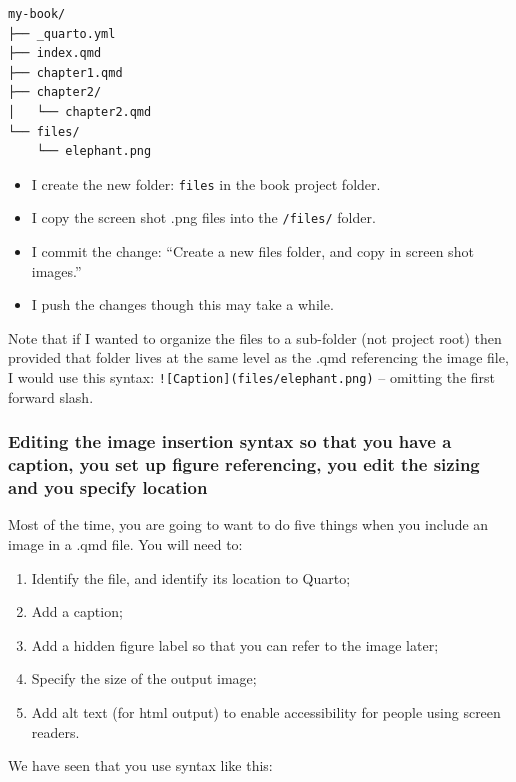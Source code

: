 \documentclass[
  letterpaper,
  DIV=11,
  numbers=noendperiod]{scrreprt}
\providecommand{\tightlist}{%
  \setlength{\itemsep}{0pt}\setlength{\parskip}{0pt}}
\begin{document}
\begin{verbatim}
my-book/
├── _quarto.yml
├── index.qmd
├── chapter1.qmd
├── chapter2/
│   └── chapter2.qmd
└── files/
    └── elephant.png
\end{verbatim}

\begin{itemize}
\tightlist
\item
  I create the new folder: \texttt{files} in the book project folder.
\item
  I copy the screen shot .png files into the \texttt{/files/} folder.
\item
  I commit the change: ``Create a new files folder, and copy in screen
  shot images.''
\item
  I push the changes though this may take a while.
\end{itemize}

Note that if I wanted to organize the files to a sub-folder (not project
root) then provided that folder lives at the same level as the .qmd
referencing the image file, I would use this syntax:
\texttt{!{[}Caption{]}(files/elephant.png)} -- omitting the first
forward slash.

\subsubsection{Editing the image insertion syntax so that you have a
caption, you set up figure referencing, you edit the sizing and you
specify
location}\label{editing-the-image-insertion-syntax-so-that-you-have-a-caption-you-set-up-figure-referencing-you-edit-the-sizing-and-you-specify-location}

Most of the time, you are going to want to do five things when you
include an image in a .qmd file. You will need to:

\begin{enumerate}
\def\labelenumi{\arabic{enumi}.}
\tightlist
\item
  Identify the file, and identify its location to Quarto;
\item
  Add a caption;
\item
  Add a hidden figure label so that you can refer to the image later;
\item
  Specify the size of the output image;
\item
  Add alt text (for html output) to enable accessibility for people
  using screen readers.
\end{enumerate}

We have seen that you use syntax like this:
\end{document}
